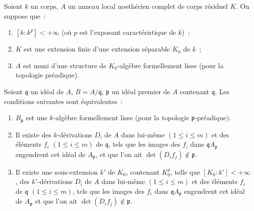 \begin{theorem}[22.7.3]
\label{0.22.7.3-fr}
Soient $k$ un corps, $A$ un anneau local noethérien complet de corps résiduel
$K$. On suppose que~:
\begin{enumerate}
  \item[$1^\circ$] $[k:k^p]<+\infty$ (où $p$ est l'exposant caractéristique
  de $k$)~;
  \item[$2^\circ$] $K$ est une extension finie d'une extension séparable
  $K_0$ de $k$~;
  \item[$3^\circ$] $A$ est muni d'une structure de $K_0$-algèbre formellement
  lisse (pour la topologie préadique).
\end{enumerate}

Soient $\mathfrak q$ un idéal de $A$, $B=A/\mathfrak q$, $\mathfrak p$ un
idéal premier de $A$ contenant $\mathfrak q$. Les conditions suivantes sont
équivalentes~:
\begin{enumerate}
  \item[\textup{a)}] $B_{\mathfrak p}$ est une $k$-algèbre formellement lisse (pour la
  topologie $\mathfrak p$-préadique).
  \item[\textup{b)}] Il existe des $k$-dérivations $D_i$ de $A$ dans lui-même
  $(1\leq i\leq m)$ et des éléments $f_i$ $(1\leq i\leq m)$ de
  $\mathfrak q$, tels que les images des $f_i$ dans
  $\mathfrak qA_{\mathfrak p}$ engendrent cet idéal de $A_{\mathfrak p}$, et
  que l'on ait $\det(D_if_j)\notin\mathfrak p$.
  \item[\textup{b')}] Il existe une sous-extension $k'$ de $K_0$, contenant $K_0^p$,
  telle que $[K_0:k']<+\infty$, des $k'$-dérivations $D_i$ de $A$ dans
  lui-même $(1\leq i\leq m)$ et des éléments $f_i$ de $\mathfrak q$
  $(1\leq i\leq m)$, tels que les images des $f_i$ dans
  $\mathfrak qA_{\mathfrak p}$ engendrent cet idéal de $A_{\mathfrak p}$ et
  que l'on ait $\det(D_if_j)\notin\mathfrak p$.
\end{enumerate}
\end{theorem}

